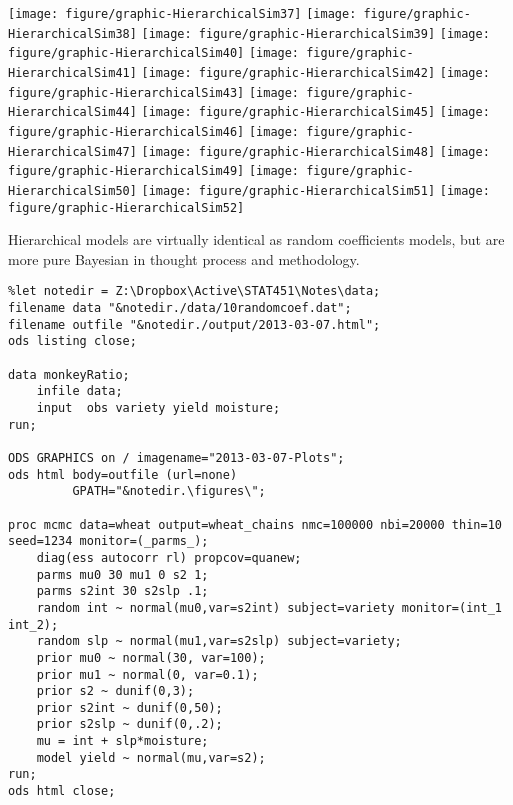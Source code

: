 \documentclass[12pt,letterpaper,oneside]{article}\usepackage{graphicx, color}
\newenvironment{knitrout}{}{} %
\newcommand{\dateTaken}{January 7, 2013}
\begin{document}
\begin{knitrout}
{\texttt{[image: figure/graphic-HierarchicalSim37]} 
\texttt{[image: figure/graphic-HierarchicalSim38]} 
\texttt{[image: figure/graphic-HierarchicalSim39]} 
\texttt{[image: figure/graphic-HierarchicalSim40]} 
\texttt{[image: figure/graphic-HierarchicalSim41]} 
\texttt{[image: figure/graphic-HierarchicalSim42]} 
\texttt{[image: figure/graphic-HierarchicalSim43]} 
\texttt{[image: figure/graphic-HierarchicalSim44]} 
\texttt{[image: figure/graphic-HierarchicalSim45]} 
\texttt{[image: figure/graphic-HierarchicalSim46]} 
\texttt{[image: figure/graphic-HierarchicalSim47]} 
\texttt{[image: figure/graphic-HierarchicalSim48]} 
\texttt{[image: figure/graphic-HierarchicalSim49]} 
\texttt{[image: figure/graphic-HierarchicalSim50]} 
\texttt{[image: figure/graphic-HierarchicalSim51]} 
\texttt{[image: figure/graphic-HierarchicalSim52]} 

}



\end{knitrout}


Hierarchical models are virtually identical as random coefficients models, but are more pure Bayesian in thought process and methodology.
\begin{lstlisting}
%let notedir = Z:\Dropbox\Active\STAT451\Notes\data;
filename data "&notedir./data/10randomcoef.dat";
filename outfile "&notedir./output/2013-03-07.html";
ods listing close;

data monkeyRatio;
    infile data;
    input  obs variety yield moisture;
run;

ODS GRAPHICS on / imagename="2013-03-07-Plots";
ods html body=outfile (url=none)
         GPATH="&notedir.\figures\";

proc mcmc data=wheat output=wheat_chains nmc=100000 nbi=20000 thin=10 seed=1234 monitor=(_parms_);
    diag(ess autocorr rl) propcov=quanew;
    parms mu0 30 mu1 0 s2 1;
    parms s2int 30 s2slp .1;
    random int ~ normal(mu0,var=s2int) subject=variety monitor=(int_1 int_2);
    random slp ~ normal(mu1,var=s2slp) subject=variety;
    prior mu0 ~ normal(30, var=100);
    prior mu1 ~ normal(0, var=0.1);
    prior s2 ~ dunif(0,3);
    prior s2int ~ dunif(0,50);
    prior s2slp ~ dunif(0,.2);
    mu = int + slp*moisture;
    model yield ~ normal(mu,var=s2);
run;
ods html close;
\end{lstlisting}
\renewcommand{\dateTaken}{March 12, 2013}
\daysep
\end{document}

